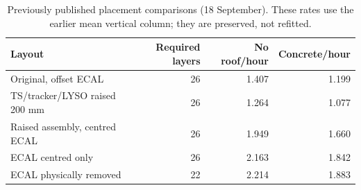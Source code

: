 \begin{table}[htbp]
\centering\small
\caption{Previously published placement comparisons (18 September). These rates use the earlier mean vertical column; they are preserved, not refitted.}\label{tab:historical}
\begin{tabular}{lrrr}
\toprule
Layout & Required layers & No roof/hour & Concrete/hour\\
\midrule
Original, offset ECAL & 26 & 1.407 & 1.199\\
TS/tracker/LYSO raised 200 mm & 26 & 1.264 & 1.077\\
Raised assembly, centred ECAL & 26 & 1.949 & 1.660\\
ECAL centred only & 26 & 2.163 & 1.842\\
ECAL physically removed & 22 & 2.214 & 1.883\\
\bottomrule
\end{tabular}
\end{table}
